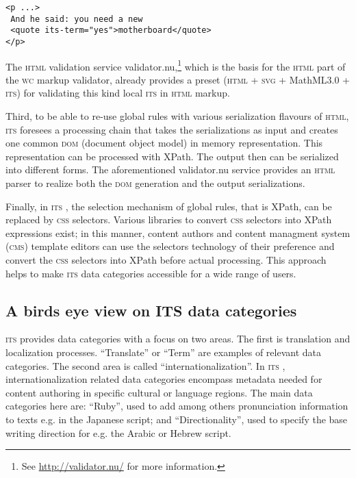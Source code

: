 \documentclass[output=paper]{LSP/langsci}
\begin{document}
\begin{lstlisting}[escapechar=@]
<p ...>
 And he said: you need a new
 <quote its-term="yes">motherboard</quote>
</p>
\end{lstlisting}

The \textsc{html} validation service validator.nu,\footnote{See \url{http://validator.nu/} for more information.} which is the basis for the \textsc{html} part of the \textsc{wc} markup validator, already provides a preset (\textsc{html} + \textsc{svg} + MathML3.0 + \textsc{its}) for validating this kind local \textsc{its } in \textsc{html} markup.

Third, to be able to re-use global rules with various serialization flavours of \textsc{html}, \textsc{its } foresees a processing chain that takes the serializations as input and creates one common \textsc{dom} (document object model) in memory representation. This representation can be processed with XPath. The output then can be serialized into different forms. The aforementioned validator.nu service provides an \textsc{html} parser to realize both the \textsc{dom} generation and the output serializations.

Finally, in \textsc{its }, the selection mechanism of global rules, that is XPath, can be replaced by \textsc{css} selectors. Various libraries to convert \textsc{css} selectors into XPath expressions exist; in this manner, content authors and content managment system (\textsc{cms}) template editors can use the selectors technology of their preference and convert the \textsc{css} selectors into XPath before actual processing. This approach helps to make \textsc{its} data categories accessible for a wide range of users.

\subsection{A birds eye view on ITS data categories}\label{sec:sasaki:3.3}

\textsc{its } provides data categories with a focus on two areas. The first is translation and localization processes. ``Translate'' or ``Term'' are examples of relevant data categories. The second area is called ``internationalization''. In \textsc{its }, internationalization related data categories encompass metadata needed for content authoring in specific cultural or language regions. The main data categories here are: ``Ruby'', used to add among others pronunciation information to texts e.g. in the Japanese script; and ``Directionality'', used to specify the base writing direction for e.g. the Arabic or Hebrew script.
\end{document}
